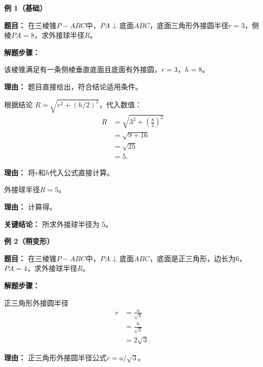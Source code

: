\begin{examplebox}
	\textbf{\textcolor{CExample}{例 1（基础）}}

	\textbf{\textcolor{CExample}{题目：}}
	在三棱锥$P-ABC$中，$PA\perp$底面$ABC$，底面三角形外接圆半径$r=3$，侧棱$PA=8$，求外接球半径$R$。

	\textbf{\textcolor{CExample}{解题步骤：}}
	\begin{description}[style=nextline, leftmargin=2.8em, labelsep=0.5em, itemsep=0.45em]
		\item[\textbf{第一步（识别条件）：}] 该棱锥满足有一条侧棱垂直底面且底面有外接圆，$r=3$，$h=8$。
			\par\textbf{理由：} 题目直接给出，符合结论适用条件。

		\item[\textbf{第二步（代入公式）：}] 根据结论 $R = \sqrt{r^{2} + (h/2)^{2}}$，代入数值：
			\[
				\begin{aligned}
					R &= \sqrt{3^{2} + \left(\frac{8}{2}\right)^{2}} \\
					&= \sqrt{9 + 16} \\
					&= \sqrt{25} \\
					&= 5.
			\end{aligned}
			\]
			\par\textbf{理由：} 将$r$和$h$代入公式直接计算。

		\item[\textbf{第三步（写出答案）：}] 外接球半径$R = 5$。
			\par\textbf{理由：} 计算得。
	\end{description}

	\textbf{\textcolor{CExample}{关键结论：}}
	所求外接球半径为 $5$。

	\medskip
	\textbf{\textcolor{CExample}{例 2（稍变形）}}

	\textbf{\textcolor{CExample}{题目：}}
	在三棱锥$P-ABC$中，$PA\perp$底面$ABC$，底面是正三角形，边长为$6$，$PA=4$，求外接球半径$R$。

	\textbf{\textcolor{CExample}{解题步骤：}}
	\begin{description}[style=nextline, leftmargin=2.8em, labelsep=0.5em, itemsep=0.45em]
		\item[\textbf{第一步（求底面半径）：}] 正三角形外接圆半径
			\[
				\begin{aligned}
					r &= \frac{a}{\sqrt{3}} \\
					&= \frac{6}{\sqrt{3}} \\
					&= 2\sqrt{3}.
			\end{aligned}
			\]
			\par\textbf{理由：} 正三角形外接圆半径公式$r = a/\sqrt{3}$。


\end{description}
\end{examplebox}
